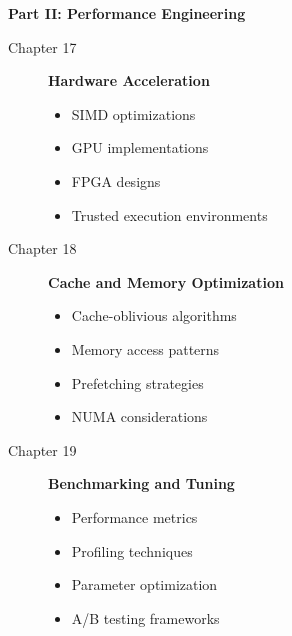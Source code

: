 \textbf{Part II: Performance Engineering}
\begin{description}
\item[Chapter 17] \textbf{Hardware Acceleration}
    \begin{itemize}
    \item SIMD optimizations
    \item GPU implementations
    \item FPGA designs
    \item Trusted execution environments
    \end{itemize}

\item[Chapter 18] \textbf{Cache and Memory Optimization}
    \begin{itemize}
    \item Cache-oblivious algorithms
    \item Memory access patterns
    \item Prefetching strategies
    \item NUMA considerations
    \end{itemize}

\item[Chapter 19] \textbf{Benchmarking and Tuning}
    \begin{itemize}
    \item Performance metrics
    \item Profiling techniques
    \item Parameter optimization
    \item A/B testing frameworks
    \end{itemize}
\end{description}

